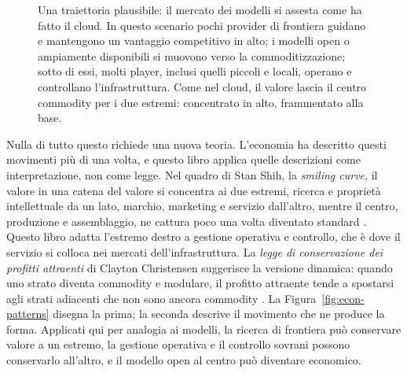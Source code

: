 \documentclass[10pt,oneside,openany]{book}
\begin{document}
\begin{figure}[!htbp]
{}
\caption{Una traiettoria plausibile: il mercato dei modelli si assesta come ha fatto il cloud. In questo scenario pochi provider di frontiera guidano e mantengono un vantaggio competitivo in alto; i modelli open o ampiamente disponibili si muovono verso la commoditizzazione; sotto di essi, molti player, inclusi quelli piccoli e locali, operano e controllano l'infrastruttura. Come nel cloud, il valore lascia il centro commodity per i due estremi: concentrato in alto, frammentato alla base.}
\label{fig:model-market}
\end{figure}

Nulla di tutto questo richiede una nuova teoria. L'economia ha descritto questi movimenti più di una volta, e questo libro applica quelle descrizioni come interpretazione, non come legge. Nel quadro di Stan Shih, la \emph{smiling curve}, il valore in una catena del valore si concentra ai due estremi, ricerca e proprietà intellettuale da un lato, marchio, marketing e servizio dall'altro, mentre il centro, produzione e assemblaggio, ne cattura poco una volta diventato standard \cite{shih1996}. Questo libro adatta l'estremo destro a gestione operativa e controllo, che è dove il servizio si colloca nei mercati dell'infrastruttura. La \emph{legge di conservazione dei profitti attraenti} di Clayton Christensen suggerisce la versione dinamica: quando uno strato diventa commodity e modulare, il profitto attraente tende a spostarsi agli strati adiacenti che non sono ancora commodity \cite{christensen2003}. La Figura~\ref{fig:econ-patterns} disegna la prima; la seconda descrive il movimento che ne produce la forma. Applicati qui per analogia ai modelli, la ricerca di frontiera può conservare valore a un estremo, la gestione operativa e il controllo sovrani possono conservarlo all'altro, e il modello open al centro può diventare economico.
\end{document}
